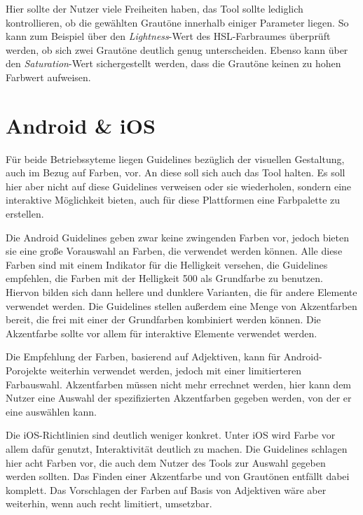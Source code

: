 Hier sollte der Nutzer viele Freiheiten haben, das Tool sollte lediglich kontrollieren, ob die gewählten Grautöne innerhalb einiger Parameter liegen. So kann zum Beispiel über den \textit{Lightness}-Wert des HSL-Farbraumes überprüft werden, ob sich zwei Grautöne deutlich genug unterscheiden. Ebenso kann über den \textit{Saturation}-Wert sichergestellt werden, dass die Grautöne keinen zu hohen Farbwert aufweisen.


\section{Android \& iOS}\label{androidios}

Für beide Betriebssyteme liegen Guidelines bezüglich der visuellen Gestaltung, auch im Bezug auf Farben, vor. An diese soll sich auch das Tool halten. Es soll hier aber nicht auf diese Guidelines verweisen oder sie wiederholen, sondern eine interaktive Möglichkeit bieten, auch für diese Plattformen eine Farbpalette zu erstellen.

Die Android Guidelines geben zwar keine zwingenden Farben vor, jedoch bieten sie eine große Vorauswahl an Farben, die verwendet werden können. Alle diese Farben sind mit einem Indikator für die Helligkeit versehen, die Guidelines empfehlen, die Farben mit der Helligkeit 500 als Grundfarbe zu benutzen. Hiervon bilden sich dann hellere und dunklere Varianten, die für andere Elemente verwendet werden.
Die Guidelines stellen außerdem eine Menge von Akzentfarben bereit, die frei mit einer der Grundfarben kombiniert werden können. Die Akzentfarbe sollte vor allem für interaktive Elemente verwendet werden.

Die Empfehlung der Farben, basierend auf Adjektiven, kann für Android-Porojekte weiterhin verwendet werden, jedoch mit einer limitierteren Farbauswahl. Akzentfarben müssen nicht mehr errechnet werden, hier kann dem Nutzer eine Auswahl der spezifizierten Akzentfarben gegeben werden, von der er eine auswählen kann.

Die iOS-Richtlinien sind deutlich weniger konkret. Unter iOS wird Farbe vor allem dafür genutzt, Interaktivität deutlich zu machen. Die Guidelines schlagen hier acht Farben vor, die auch dem Nutzer des Tools zur Auswahl gegeben werden sollten. Das Finden einer Akzentfarbe und von Grautönen entfällt dabei komplett. Das Vorschlagen der Farben auf Basis von Adjektiven wäre aber weiterhin, wenn auch recht limitiert, umsetzbar.


